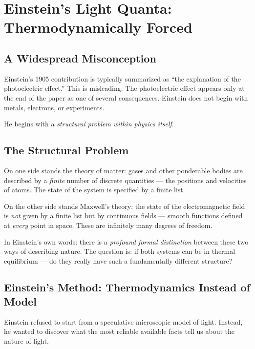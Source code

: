 \section{Einstein's Light Quanta: Thermodynamically Forced}
\label{sec:einstein}

\subsection{A Widespread Misconception}

Einstein's 1905 contribution is typically summarized as ``the explanation of the 
photoelectric effect.'' This is misleading. The photoelectric effect appears only at 
the end of the paper as one of several consequences. Einstein does not begin with 
metals, electrons, or experiments.

He begins with a \emph{structural problem within physics itself}.

\subsection{The Structural Problem}

On one side stands the theory of matter: gases and other ponderable bodies are 
described by a \emph{finite} number of discrete quantities — the positions and 
velocities of atoms. The state of the system is specified by a finite list.

On the other side stands Maxwell's theory: the state of the electromagnetic field 
is \emph{not} given by a finite list but by continuous fields — smooth functions 
defined at \emph{every} point in space. These are infinitely many degrees of freedom.

In Einstein's own words: there is a \emph{profound formal distinction} between 
these two ways of describing nature. The question is: if both systems can be in 
thermal equilibrium — do they really have such a fundamentally different structure?

\subsection{Einstein's Method: Thermodynamics Instead of Model}

Einstein refused to start from a speculative microscopic model of light. Instead, 
he wanted to discover what the most reliable available facts tell us about the 
nature of light.

